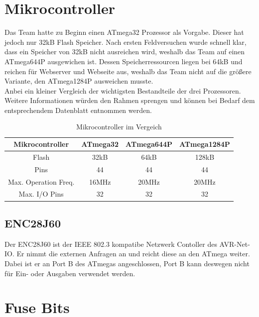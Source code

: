 \section{Mikrocontroller}
Das Team hatte zu Beginn einen ATmega32 Prozessor als Vorgabe. Dieser hat jedoch nur 32kB Flash Speicher. Nach ersten 
Feldversuchen wurde schnell klar, dass ein Speicher von 32kB nicht ausreichen wird, weshalb das Team auf einen ATmega644P 
ausgewichen ist. Dessen Speicherressourcen liegen bei 64kB und reichen für Webserver und Webseite aus, weshalb das Team 
nicht auf die größere Variante, den ATmega1284P ausweichen musste.\\ 
Anbei ein kleiner Vergleich der wichtigsten Bestandteile der 
drei Prozessoren. Weitere Informationen würden den Rahmen sprengen und können
bei Bedarf dem entsprechendem Datenblatt entnommen werden.

\begin{table}[H]
\begin{tabular}{|c|c|c|c|} \hline 
  Mikrocontroller & ATmega32 & ATmega644P & ATmega1284P \\ \hline 
  Flash & 32kB & 64kB & 128kB \\ \hline
  Pins & 44 & 44 & 44 \\ \hline
  Max. Operation Freq. & 16MHz & 20MHz & 20MHz\\ \hline
  Max. I/O Pins & 32 & 32 & 32 \\ \hline
\end{tabular}
\caption{Mikrocontroller im Vergeich}
\label{mikrocontroller}
\end{table}

\subsection{ENC28J60}

Der ENC28J60 ist der IEEE 802.3 kompatibe Netzwerk Contoller des AVR-Net-IO. Er
nimmt die externen Anfragen an und reicht diese an den ATmega weiter. Dabei ist
er an Port B des ATmegas angeschlossen, Port B kann deswegen nicht für Ein- oder
Ausgaben verwendet werden.

\newpage
\section{Fuse Bits}
\label{chap:Fuse}

